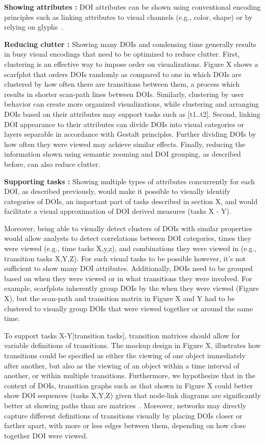 \textbf{Showing attributes :} DOI attributes can be shown using conventional encoding principles such as linking attributes to visual channels (e.g., color, shape) or by relying on glyphs~\cite{maguire2012taxonomy}. 

\textbf{Reducing clutter :}
Showing many DOIs and condensing time generally results in busy visual encodings that need to be optimized to reduce clutter. First, clustering is an effective way to impose order on visualizations. Figure X shows a scarfplot that orders DOIs randomly as compared to one in which DOIs are clustered by how often there are transitions between them, a process which results in shorter scan-path lines between DOIs. Similarly, clustering by user behavior can create more organized visualizations, while clustering and arranging DOIs based on their attributes may support tasks such as [t1..t2]. Second, linking DOI appearance to their attributes can divide DOIs into visual categories or layers separable in accordance with Gestalt principles. Further dividing DOIs by how often they were viewed may achieve similar effects.  Finally, reducing the information shown using semantic zooming and DOI grouping, as described before, can also reduce clutter. 

\textbf{Supporting tasks :}
Showing multiple types of attributes concurrently for each DOI, as described previously, would make it possible to visually identify categories of DOIs, an important part of tasks described in section X, and would facilitate a visual approximation of DOI derived measures (tasks X - Y). 

Moreover, being able to visually detect clusters of DOIs with similar properties would allow analysts to detect correlations between DOI categories, times they were viewed (e.g., time tasks X,y,z), and combinations they were viewed in (e.g., transition tasks X,Y,Z). For such visual tasks to be possible however, it's not sufficient to show many DOI attributes. Additionally, DOIs need to be grouped based on when they were viewed or in what transitions they were involved. For example, scarfplots inherently group DOIs by the when they were viewed (Figure X), but the scan-path and transition matrix in Figure X and Y had to be clustered to visually group DOIs that were viewed together or around the same time. 

To support tasks X-Y[transition tasks], transition matrices should allow for  variable definitions of transitions. The mockup design in Figure X, illustrates how transitions could be specified as either the viewing of one object immediately after another, but also as the viewing of an object within a time interval of another, or within multiple transitions. Furthermore, we hypothesize that in the context of DOIs, transition graphs such as that shown in Figure X could better show DOI sequences (tasks X,Y,Z) given that node-link diagrams are significantly better at showing paths than are matrices~\cite{ghoniem2004comparison,okoe15ecological}.  Moreover, networks may directly capture different definitions of transitions visually by placing DOIs closer or farther apart, with more or less edges between them, depending on how close together DOI were viewed. 

